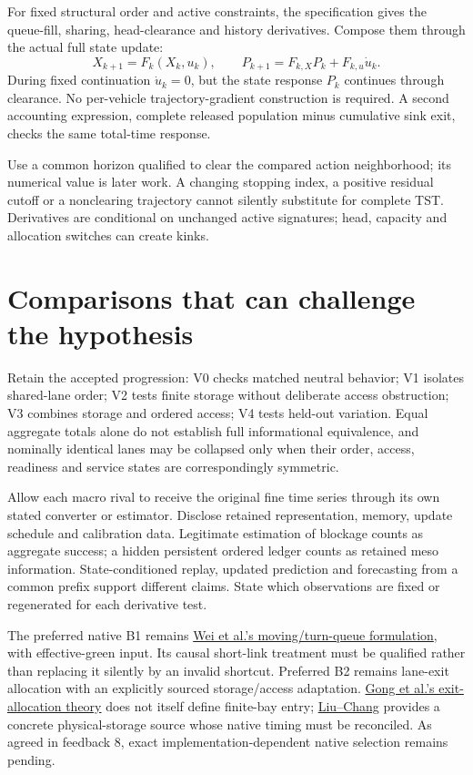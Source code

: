 \documentclass[11pt,a4paper]{article}
\begin{document}
For fixed structural order and active constraints, the specification gives
the queue-fill, sharing, head-clearance and history derivatives. Compose
them through the actual full state update:
\begin{equation}
 X_{k+1}=F_k(X_k,u_k),\qquad
 P_{k+1}=F_{k,X}P_k+F_{k,u}\dot u_k.
 \label{eq:compact-chain}
\end{equation}
During fixed continuation $\dot u_k=0$, but the state response $P_k$
continues through clearance. No per-vehicle trajectory-gradient construction
is required. A second accounting expression, complete released population
minus cumulative sink exit, checks the same total-time response.

Use a common horizon qualified to clear the compared action neighborhood;
its numerical value is later work. A changing stopping index, a positive
residual cutoff or a nonclearing trajectory cannot silently substitute for
complete TST. Derivatives are conditional on unchanged active signatures;
head, capacity and allocation switches can create kinks.

\section{Comparisons that can challenge the hypothesis}

Retain the accepted progression: V0 checks matched neutral behavior; V1
isolates shared-lane order; V2 tests finite storage without deliberate access
obstruction; V3 combines storage and ordered access; V4 tests held-out
variation. Equal aggregate totals alone do not establish full informational
equivalence, and nominally identical lanes may be collapsed only when their
order, access, readiness and service states are correspondingly symmetric.

Allow each macro rival to receive the original fine time series through
its own stated converter or estimator. Disclose retained representation,
memory, update schedule and calibration data. Legitimate estimation of
blockage counts as aggregate success; a hidden persistent ordered ledger
counts as retained meso information. State-conditioned replay, updated
prediction and forecasting from a common prefix support different claims.
State which observations are fixed or regenerated for each derivative test.

The preferred native B1 remains
\href{https://arxiv.org/html/2310.12249v2}{Wei et al.'s moving/turn-queue formulation},
with effective-green input. Its causal short-link treatment must be qualified
rather than replacing it silently by an invalid shortcut. Preferred B2
remains lane-exit allocation with an explicitly sourced storage/access
adaptation. \href{https://www.sciencedirect.com/science/article/pii/S0191261525000578}
{Gong et al.'s exit-allocation theory} does not itself define
finite-bay entry; \href{https://attap.umd.edu/wp-content/uploads/2022/05/TRC522.pdf}
{Liu--Chang} provides a concrete physical-storage source
whose native timing must be reconciled. As agreed in feedback 8, exact
implementation-dependent native selection remains pending.
\end{document}

